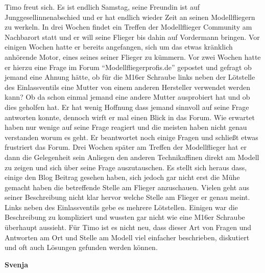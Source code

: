 Timo freut sich. Es ist endlich Samstag, seine Freundin ist auf Junggesellinnenabschied und er hat
endlich wieder Zeit an seinen Modellfliegern zu werkeln. In drei Wochen findet ein Treffen der
Modellflieger Community am Nachbarort statt und er will seine Flieger bis dahin auf Vordermann
bringen. Vor einigen Wochen hatte er bereits angefangen, sich um das etwas kränklich anhörende
Motor, eines seines seiner Flieger zu kümmern. Vor zwei Wochen hatte er hierzu eine Frage im
Forum “Modellfliegerprofis.de” gepostet und gefragt ob jemand eine Ahnung hätte, ob für die M16er
Schraube links neben der Lötstelle des Einlassventils eine Mutter von einem anderen Hersteller
verwendet werden kann? Ob da schon einmal jemand eine andere Mutter ausprobiert hat und ob dies
geholfen hat.
Er hat wenig Hoffnung dass jemand sinnvoll auf seine Frage antworten konnte, dennoch wirft er mal
einen Blick in das Forum. Wie erwartet haben nur wenige auf seine Frage reagiert und die meisten
haben nicht genau verstanden worum es geht. Er beantwortet noch einige Fragen und schließt etwas
frustriert das Forum.
Drei Wochen später am Treffen der Modellflieger hat er dann die Gelegenheit sein Anliegen den
anderen Technikaffinen direkt am Modell zu zeigen und sich über seine Frage auszutauschen. Es
stellt sich heraus dass, einige den Blog Beitrag gesehen haben, sich jedoch gar nicht erst die Mühe
gemacht haben die betreffende Stelle am Flieger anzuschauen. Vielen geht aus seiner Beschreibung
nicht klar hervor welche Stelle am Flieger er genau meint. Links neben des Einlassventils gebe es
mehrere Lötstellen. Einigen war die Beschreibung zu kompliziert und wussten gar nicht wie eine
M16er Schraube überhaupt aussieht.
Für Timo ist es nicht neu, dass dieser Art von Fragen und Antworten am Ort und Stelle am Modell viel
einfacher beschrieben, diskutiert und oft auch Lösungen gefunden werden können.


\vspace{2mm}
\textbf{Svenja}

